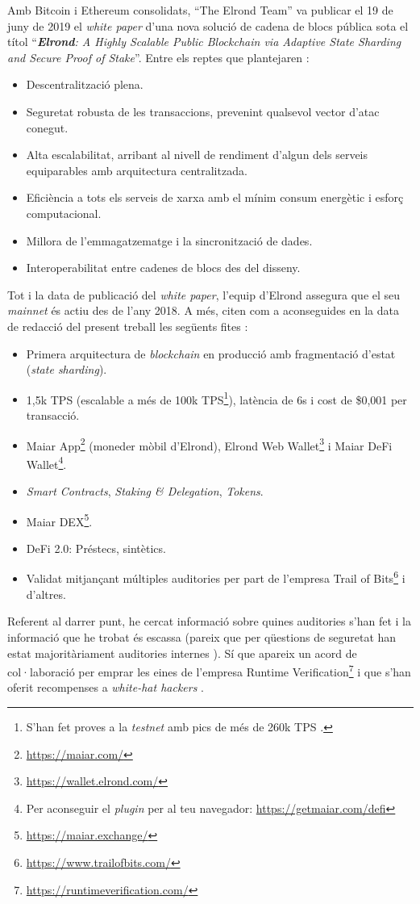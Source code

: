 \documentclass[11pt,a4paper]{article}
\begin{document}
Amb Bitcoin i Ethereum consolidats, ``The Elrond Team'' va publicar el 19 de juny de 2019 el \textit{white paper} d'una nova solució de cadena de blocs pública sota el títol ``\textit{\textbf{Elrond}: A Highly Scalable Public Blockchain via Adaptive State Sharding and Secure Proof of Stake}''. Entre els reptes que plantejaren \cite{elrond2022, elrond2019}:
\begin{itemize}
    \item Descentralització plena.
    \item Seguretat robusta de les transaccions, prevenint qualsevol vector d'atac conegut.
    \item Alta escalabilitat, arribant al nivell de rendiment d'algun dels serveis equiparables amb arquitectura centralitzada.
    \item Eficiència a tots els serveis de xarxa amb el mínim consum energètic i esforç computacional.
    \item Millora de l'emmagatzematge i la sincronització de dades.
    \item Interoperabilitat entre cadenes de blocs des del disseny.
\end{itemize}
Tot i la data de publicació del \textit{white paper}, l'equip d'Elrond assegura que el seu \textit{mainnet} és actiu des de l'any 2018. A més, citen com a aconseguides en la data de redacció del present treball les següents fites \cite{elrond2022, mincul2021}:
\begin{itemize}
    \item Primera arquitectura de \textit{blockchain} en producció amb fragmentació d'estat (\textit{state sharding}).
    \item 1,5k TPS (escalable a més de 100k TPS\footnote{S'han fet proves a la \textit{testnet} amb pics de més de 260k TPS \cite{elrond2022}.}), latència de 6s i cost de \$0,001 per transacció.
    \item Maiar App\footnote{\url{https://maiar.com/}} (moneder mòbil d'Elrond), Elrond Web Wallet\footnote{\url{https://wallet.elrond.com/}} i Maiar DeFi Wallet\footnote{Per aconseguir el \textit{plugin} per al teu navegador: \url{https://getmaiar.com/defi}}.
    \item \textit{Smart Contracts}, \textit{Staking \& Delegation}, \textit{Tokens}.
    \item Maiar DEX\footnote{\url{https://maiar.exchange/}}.
    \item DeFi 2.0: Préstecs, sintètics.
    \item Validat mitjançant múltiples auditories per part de l'empresa Trail of Bits\footnote{\url{https://www.trailofbits.com/}} i d'altres.
\end{itemize}
Referent al darrer punt, he cercat informació sobre quines auditories s'han fet i la informació que he trobat és escassa (pareix que per qüestions de seguretat han estat majoritàriament auditories internes \cite{mincub2019}). Sí que apareix un acord de col·laboració per emprar les eines de l'empresa Runtime Verification\footnote{\url{https://runtimeverification.com/}} i que s'han oferit recompenses a \textit{white-hat hackers} \cite{bounties01, mincub2021}.
\end{document}
